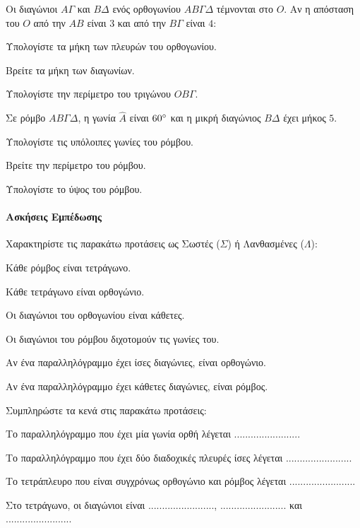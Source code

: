 \documentclass[11pt,a4paper,modern]{FFExercises}
\begin{document}
\askhsh
Οι διαγώνιοι $Α\varGamma$ και $Β\Delta$ ενός ορθογωνίου $ΑΒ\varGamma\Delta$ τέμνονται στο $Ο$. Αν η απόσταση του $Ο$ από την $ΑΒ$ είναι $3$ και από την $Β\varGamma$ είναι $4$:
\begin{alist}
    \item Υπολογίστε τα μήκη των πλευρών του ορθογωνίου.
    \item Βρείτε τα μήκη των διαγωνίων.
    \item Υπολογίστε την περίμετρο του τριγώνου $ΟΒ\varGamma$.
\end{alist}

\askhsh
Σε ρόμβο $ΑΒ\varGamma\Delta$, η γωνία $\hat{Α}$ είναι $60\degree$ και η μικρή διαγώνιος $Β\Delta$ έχει μήκος $5$.
\begin{alist}
    \item Υπολογίστε τις υπόλοιπες γωνίες του ρόμβου.
    \item Βρείτε την περίμετρο του ρόμβου.
    \item Υπολογίστε το ύψος του ρόμβου.
\end{alist}

\paragraph{Ασκήσεις Εμπέδωσης}

\askhsh
Χαρακτηρίστε τις παρακάτω προτάσεις ως Σωστές ($\Sigma$) ή Λανθασμένες ($\Lambda$):
\begin{alist}
    \item Κάθε ρόμβος είναι τετράγωνο.
    \item Κάθε τετράγωνο είναι ορθογώνιο.
    \item Οι διαγώνιοι του ορθογωνίου είναι κάθετες.
    \item Οι διαγώνιοι του ρόμβου διχοτομούν τις γωνίες του.
    \item Αν ένα παραλληλόγραμμο έχει ίσες διαγώνιες, είναι ορθογώνιο.
    \item Αν ένα παραλληλόγραμμο έχει κάθετες διαγώνιες, είναι ρόμβος.
\end{alist}

\askhsh
Συμπληρώστε τα κενά στις παρακάτω προτάσεις:
\begin{alist}
    \item Το παραλληλόγραμμο που έχει μία γωνία ορθή λέγεται ........................
    \item Το παραλληλόγραμμο που έχει δύο διαδοχικές πλευρές ίσες λέγεται ........................
    \item Το τετράπλευρο που είναι συγχρόνως ορθογώνιο και ρόμβος λέγεται ........................
    \item Στο τετράγωνο, οι διαγώνιοι είναι ........................, ........................ και ........................
\end{alist}
\end{document}
